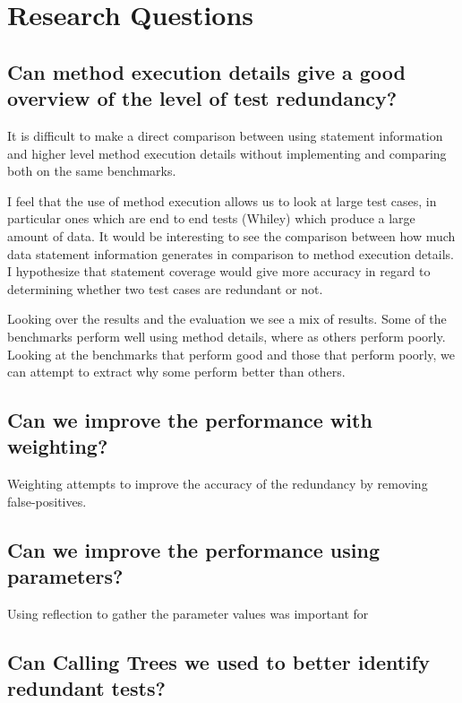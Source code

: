 \section{Research Questions}

\subsection{Can method execution details give a good overview of the level of test redundancy?}

It is difficult to make a direct comparison between using statement information and higher level method execution details without implementing and comparing both on the same benchmarks. 

I feel that the use of method execution allows us to look at large test cases, in particular ones which are end to end tests (Whiley) which produce a large amount of data. It would be interesting to see the comparison between how much data statement information generates in comparison to method execution details. I hypothesize that statement coverage would give more accuracy in regard to determining whether two test cases are redundant or not.

Looking over the results and the evaluation we see a mix of results. Some of the benchmarks perform well using method details, where as others  perform poorly. Looking at the benchmarks that perform good and those that perform poorly, we can attempt to extract why some perform better than others. 

\subsection{Can we improve the performance with weighting?}

Weighting attempts to improve the accuracy of the redundancy by removing false-positives.

\subsection{Can we improve the performance using parameters?}

Using reflection to gather the parameter values was important for

\subsection{Can Calling Trees we used to better identify redundant tests?}


